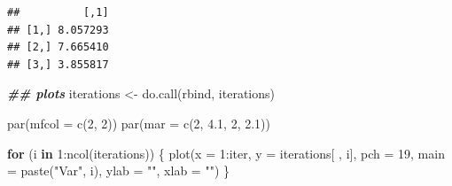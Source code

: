 \documentclass[
]{book}
\newenvironment{Shaded}{\begin{snugshade}}{\end{snugshade}}
\newcommand{\AttributeTok}[1]{\textcolor[rgb]{0.77,0.63,0.00}{#1}}
\newcommand{\ControlFlowTok}[1]{\textcolor[rgb]{0.13,0.29,0.53}{\textbf{#1}}}
\newcommand{\DecValTok}[1]{\textcolor[rgb]{0.00,0.00,0.81}{#1}}
\newcommand{\DocumentationTok}[1]{\textcolor[rgb]{0.56,0.35,0.01}{\textbf{\textit{#1}}}}
\newcommand{\FloatTok}[1]{\textcolor[rgb]{0.00,0.00,0.81}{#1}}
\newcommand{\FunctionTok}[1]{\textcolor[rgb]{0.00,0.00,0.00}{#1}}
\newcommand{\NormalTok}[1]{#1}
\newcommand{\OtherTok}[1]{\textcolor[rgb]{0.56,0.35,0.01}{#1}}
\newcommand{\SpecialCharTok}[1]{\textcolor[rgb]{0.00,0.00,0.00}{#1}}
\newcommand{\StringTok}[1]{\textcolor[rgb]{0.31,0.60,0.02}{#1}}
\begin{document}
\begin{verbatim}
##          [,1]
## [1,] 8.057293
## [2,] 7.665410
## [3,] 3.855817
\end{verbatim}

\begin{Shaded}
\begin{Highlighting}[]
\DocumentationTok{\#\# plots}
\NormalTok{iterations }\OtherTok{\textless{}{-}} \FunctionTok{do.call}\NormalTok{(rbind, iterations)}

\FunctionTok{par}\NormalTok{(}\AttributeTok{mfcol =} \FunctionTok{c}\NormalTok{(}\DecValTok{2}\NormalTok{, }\DecValTok{2}\NormalTok{))}
\FunctionTok{par}\NormalTok{(}\AttributeTok{mar =} \FunctionTok{c}\NormalTok{(}\DecValTok{2}\NormalTok{, }\FloatTok{4.1}\NormalTok{, }\DecValTok{2}\NormalTok{, }\FloatTok{2.1}\NormalTok{))}

\ControlFlowTok{for}\NormalTok{ (i }\ControlFlowTok{in} \DecValTok{1}\SpecialCharTok{:}\FunctionTok{ncol}\NormalTok{(iterations)) \{}
  \FunctionTok{plot}\NormalTok{(}\AttributeTok{x =} \DecValTok{1}\SpecialCharTok{:}\NormalTok{iter,}
       \AttributeTok{y =}\NormalTok{ iterations[ , i],}
       \AttributeTok{pch =} \DecValTok{19}\NormalTok{,}
       \AttributeTok{main =} \FunctionTok{paste}\NormalTok{(}\StringTok{"Var"}\NormalTok{, i),}
       \AttributeTok{ylab =} \StringTok{""}\NormalTok{,}
       \AttributeTok{xlab =} \StringTok{""}\NormalTok{)}
\NormalTok{\}}
\end{Highlighting}
\end{Shaded}
\end{document}
